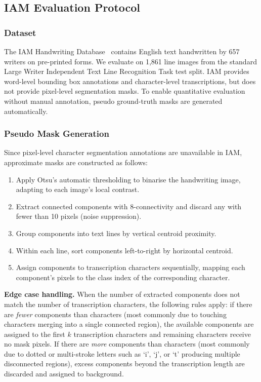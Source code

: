 \documentclass[a4paper,11pt]{article}
\begin{document}
\subsection{IAM Evaluation Protocol}

\subsubsection{Dataset}

The IAM Handwriting Database~\cite{marti2002} contains English text handwritten by 657
writers on pre-printed forms. We evaluate on 1,861 line images from the standard Large
Writer Independent Text Line Recognition Task test split. IAM provides word-level
bounding box annotations and character-level transcriptions, but does not provide
pixel-level segmentation masks. To enable quantitative evaluation without manual
annotation, pseudo ground-truth masks are generated automatically.

\subsubsection{Pseudo Mask Generation}
\label{sec:pseudo_masks}

Since pixel-level character segmentation annotations are unavailable in IAM, approximate
masks are constructed as follows:

\begin{enumerate}[leftmargin=*, label=\arabic*.]
    \item Apply Otsu's automatic thresholding to binarise the handwriting image, adapting
          to each image's local contrast.
    \item Extract connected components with 8-connectivity and discard any with fewer than
          10 pixels (noise suppression).
    \item Group components into text lines by vertical centroid proximity.
    \item Within each line, sort components left-to-right by horizontal centroid.
    \item Assign components to transcription characters sequentially, mapping each
          component's pixels to the class index of the corresponding character.
\end{enumerate}

\noindent\textbf{Edge case handling.} When the number of extracted components does not
match the number of transcription characters, the following rules apply: if there are
\emph{fewer} components than characters (most commonly due to touching characters merging
into a single connected region), the available components are assigned to the first $k$
transcription characters and remaining characters receive no mask pixels. If there are
\emph{more} components than characters (most commonly due to dotted or multi-stroke
letters such as `i', `j', or `t' producing multiple disconnected regions), excess
components beyond the transcription length are discarded and assigned to background.
\end{document}
